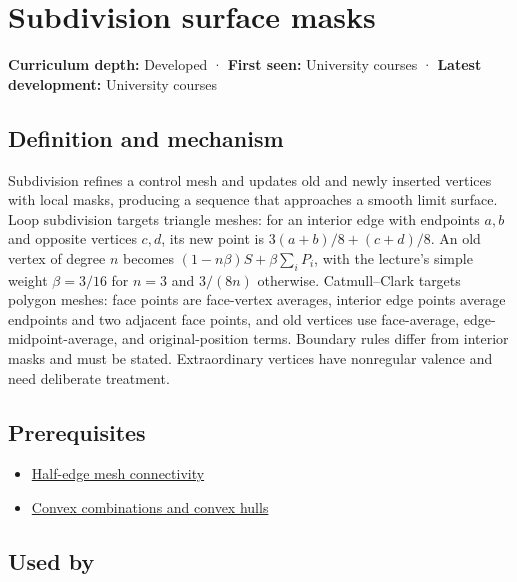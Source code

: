 \hypertarget{appendix-0234ab7f86b1}{}\label{referencestart:appendix-0234ab7f86b1}
\section{Subdivision surface masks}\label{appendix-0234ab7f86b1-subdivision-surface-masks}

\textbf{Curriculum depth:} Developed · \textbf{First seen:} University courses · \textbf{Latest development:} University courses

\subsection{Definition and mechanism}\label{appendix-0234ab7f86b1-definition-and-mechanism}

Subdivision refines a control mesh and updates old and newly inserted vertices with local masks, producing a sequence that approaches a smooth limit surface. Loop subdivision targets triangle meshes: for an interior edge with endpoints \(a,b\) and opposite vertices \(c,d\), its new point is \(3(a+b)/8+(c+d)/8\). An old vertex of degree \(n\) becomes \((1-n\beta)S+\beta\sum_iP_i\), with the lecture's simple weight \(\beta=3/16\) for \(n=3\) and \(3/(8n)\) otherwise. Catmull--Clark targets polygon meshes: face points are face-vertex averages, interior edge points average endpoints and two adjacent face points, and old vertices use face-average, edge-midpoint-average, and original-position terms. Boundary rules differ from interior masks and must be stated. Extraordinary vertices have nonregular valence and need deliberate treatment.

\subsection{Prerequisites}\label{appendix-0234ab7f86b1-prerequisites}

\begin{itemize}
\tightlist
\item
  \hyperref[appendix-1aea26b2307f]{Half-edge mesh connectivity}
\item
  \hyperref[appendix-0026ec42c9d5]{Convex combinations and convex hulls}
\end{itemize}

\subsection{Used by}\label{appendix-0234ab7f86b1-used-by}

